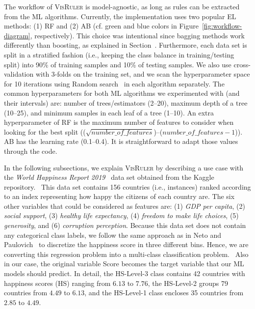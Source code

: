 The workflow of \textsc{VisRuler} is model-agnostic, as long as rules can be extracted from the ML algorithms. 
Currently, the implementation uses two popular EL methods: (1) RF and (2) AB (cf. green and blue colors in Figure~\ref{fig:workflow-diagram}, respectively). 
This choice was intentional since bagging methods work differently than boosting, as explained in Section~. 
Furthermore, each data set is split in a stratified fashion (i.e., keeping the class balance in training/testing split) into 90\% of training samples and 10\% of testing samples. We also use cross-validation with 3-folds on the training set, and we scan the hyperparameter space for 10 iterations using Random search~\cite{Bergstra2012Random} in each algorithm separately. The common hyperparameters for both ML algorithms we experimented with (and their intervals) are: number of trees/estimators (2--20), maximum depth of a tree (10--25), and minimum samples in each leaf of a tree (1--10). 
An extra hyperparameter of RF is the maximum number of features to consider when looking for the best split (($\sqrt{number\_of\_features}$)--($number\_of\_features-1$)). AB has the learning rate (0.1--0.4). It is straightforward to adapt those values through the code.

In the following subsections, we explain \textsc{VisRuler} by describing a use case with the \emph{World Happiness Report 2019}~\cite{Helliwell2019World} data set obtained from the Kaggle repository.~\cite{Kaggle2019} This data set contains 156 countries (i.e., instances) ranked according to an index representing how happy the citizens of each country are. The six other variables that could be considered as features are: (1) \emph{GDP per capita}, (2) \emph{social support}, (3) \emph{healthy life expectancy}, (4) \emph{freedom to make life choices}, (5) \emph{generosity}, and (6) \emph{corruption perception}. Because this data set does not contain any categorical class labels, we follow the same approach as in Neto and Paulovich~\cite{Neto2021Multivariate} to discretize the happiness score in three different bins. Hence, we are converting this regression problem into a multi-class classification problem.~\cite{Salman2012Regression} Also in our case, the original variable Score becomes the target variable that our ML models should predict. In detail, the HS-Level-3 class contains 42 countries with happiness scores (HS) ranging from $6.13$ to $7.76$, the HS-Level-2 groups 79 countries from $4.49$ to $6.13$, and the HS-Level-1 class encloses 35 countries from $2.85$ to $4.49$.

